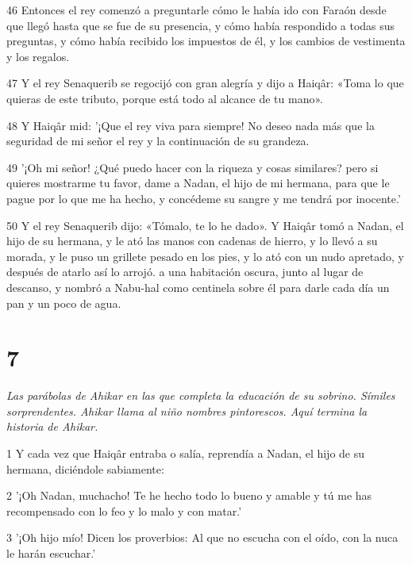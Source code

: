\par 46 Entonces el rey comenzó a preguntarle cómo le había ido con Faraón desde que llegó hasta que se fue de su presencia, y cómo había respondido a todas sus preguntas, y cómo había recibido los impuestos de él, y los cambios de vestimenta y los regalos.

\par 47 Y el rey Senaquerib se regocijó con gran alegría y dijo a Haiqâr: «Toma lo que quieras de este tributo, porque está todo al alcance de tu mano».

\par 48 Y Haiqâr mid: '¡Que el rey viva para siempre! No deseo nada más que la seguridad de mi señor el rey y la continuación de su grandeza.

\par 49 '¡Oh mi señor! ¿Qué puedo hacer con la riqueza y cosas similares? pero si quieres mostrarme tu favor, dame a Nadan, el hijo de mi hermana, para que le pague por lo que me ha hecho, y concédeme su sangre y me tendrá por inocente.'

\par 50 Y el rey Senaquerib dijo: «Tómalo, te lo he dado». Y Haiqâr tomó a Nadan, el hijo de su hermana, y le ató las manos con cadenas de hierro, y lo llevó a su morada, y le puso un grillete pesado en los pies, y lo ató con un nudo apretado, y después de atarlo así lo arrojó. a una habitación oscura, junto al lugar de descanso, y nombró a Nabu-hal como centinela sobre él para darle cada día un pan y un poco de agua.

\chapter{7}

\par \textit{Las parábolas de Ahikar en las que completa la educación de su sobrino. Símiles sorprendentes. Ahikar llama al niño nombres pintorescos. Aquí termina la historia de Ahikar.}

\par 1 Y cada vez que Haiqâr entraba o salía, reprendía a Nadan, el hijo de su hermana, diciéndole sabiamente:

\par 2 '¡Oh Nadan, muchacho! Te he hecho todo lo bueno y amable y tú me has recompensado con lo feo y lo malo y con matar.'

\par 3 '¡Oh hijo mío! Dicen los proverbios: Al que no escucha con el oído, con la nuca le harán escuchar.'

